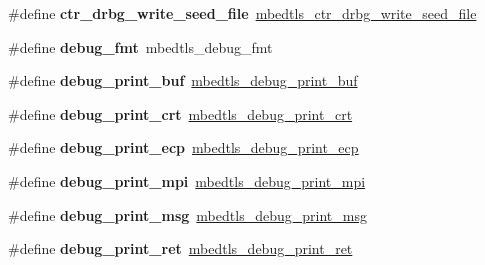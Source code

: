 \begin{DoxyCompactItemize}
\item 
\mbox{\label{compat-1_83_8h_af0d2ed8090d1d60f81667821e58a7b58}} 
\#define {\bfseries ctr\+\_\+drbg\+\_\+write\+\_\+seed\+\_\+file}~\mbox{\hyperlink{ctr__drbg_8h_af8411dc8a4d9b2a7a5b4adf2ff3d9586}{mbedtls\+\_\+ctr\+\_\+drbg\+\_\+write\+\_\+seed\+\_\+file}}
\item 
\mbox{\label{compat-1_83_8h_ac37ce81c43c6f7e995ab28fc88066159}} 
\#define {\bfseries debug\+\_\+fmt}~mbedtls\+\_\+debug\+\_\+fmt
\item 
\mbox{\label{compat-1_83_8h_a8d321f818c9ca88c92b3511837ba2410}} 
\#define {\bfseries debug\+\_\+print\+\_\+buf}~\mbox{\hyperlink{debug_8h_abd948e0fd4d81c1ef908b81ba6961614}{mbedtls\+\_\+debug\+\_\+print\+\_\+buf}}
\item 
\mbox{\label{compat-1_83_8h_a8757f896c3f76177a041eef9cb3bf17f}} 
\#define {\bfseries debug\+\_\+print\+\_\+crt}~\mbox{\hyperlink{debug_8h_ac6af6ac3c4308a5f7abeaa30ee444d3d}{mbedtls\+\_\+debug\+\_\+print\+\_\+crt}}
\item 
\mbox{\label{compat-1_83_8h_a57d17eb389c9237cee323b81aaaef4fd}} 
\#define {\bfseries debug\+\_\+print\+\_\+ecp}~\mbox{\hyperlink{debug_8h_a67c49649a174985ae4a2b3e585a72efd}{mbedtls\+\_\+debug\+\_\+print\+\_\+ecp}}
\item 
\mbox{\label{compat-1_83_8h_ab98d372d1718db99dc81b20a43544f8d}} 
\#define {\bfseries debug\+\_\+print\+\_\+mpi}~\mbox{\hyperlink{debug_8h_a43a3f5a37b9816abb8c68fca8942780d}{mbedtls\+\_\+debug\+\_\+print\+\_\+mpi}}
\item 
\mbox{\label{compat-1_83_8h_ada837dc6ea426a824b73359f6df2fde9}} 
\#define {\bfseries debug\+\_\+print\+\_\+msg}~\mbox{\hyperlink{debug_8h_aed62ccbc2142782faf6b0ad5d46ab226}{mbedtls\+\_\+debug\+\_\+print\+\_\+msg}}
\item 
\mbox{\label{compat-1_83_8h_a32f983f91edb6927f88517abfc273b0d}} 
\#define {\bfseries debug\+\_\+print\+\_\+ret}~\mbox{\hyperlink{debug_8h_ac38765871abd623d8acee7091f04c061}{mbedtls\+\_\+debug\+\_\+print\+\_\+ret}}
\item 
\mbox{\label{compat-1_83_8h_ae86e91eeabb315434ec3ef2f544e66c1}} 

\end{DoxyCompactItemize}
